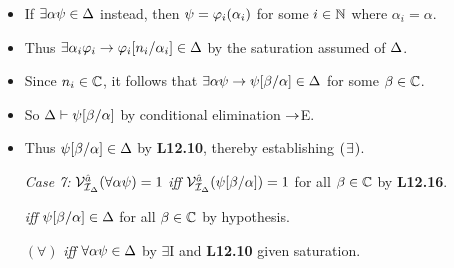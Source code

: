 \documentclass[a4paper, 11pt]{article} %
\begin{document}
\begin{itemize}
    \item If $\exists \alpha\psi\in\Delta$ instead, then $\psi=\varphi_i(\alpha_i)$ for some $i\in\mathbb{N}$ where $\alpha_i=\alpha$.
    \item Thus $\exists \alpha_i\varphi_i\rightarrow \varphi_i[n_i/\alpha_i]\in\Delta$ by the saturation assumed of $\Delta$.
    \item Since $n_i\in\mathbb{C}$, it follows that $\exists \alpha\psi\rightarrow\psi[\beta/\alpha]\in\Delta$ for some $\beta\in\mathbb{C}$.
    \item So $\Delta\vdash\psi[\beta/\alpha]$ by conditional elimination $\rightarrow$E. 
    \item Thus $\psi[\beta/\alpha]\in\Delta$ by \textbf{L12.10}, thereby establishing $(\hspace{.7pt}\exists\hspace{.7pt})$.
  \item[\it Case 7:] $\mathcal{V}_{\mathcal{I}_{\Delta}}^{\hat{a}}(\forall \alpha\psi)=1$  \textit{iff} $\mathcal{V}_{\mathcal{I}_{\Delta}}^{\hat{a}}(\psi[\beta/\alpha])=1$ for all $\beta\in\mathbb{C}$ by \textbf{L12.16}.
    \item[] \strut\hspace{.93in} \textit{iff} $\psi[\beta/\alpha]\in\Delta$ for all $\beta\in\mathbb{C}$ by hypothesis.
    \item[] $(\forall)$ \hspace{.68in} \textit{iff} $\forall \alpha\psi\in\Delta$ by $\exists$I and \textbf{L12.10} given saturation.  


\end{itemize}
\end{document}

